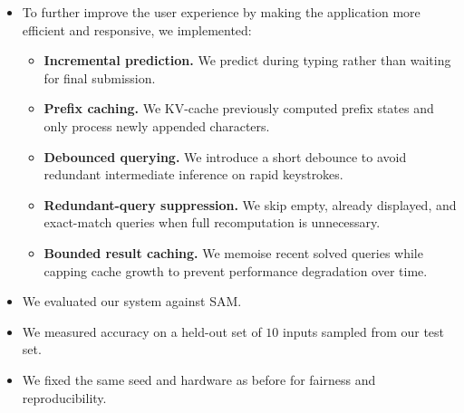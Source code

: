 \documentclass[aspectratio=169,notheorems,10pt]{beamer}
\theoremstyle{definition}
\begin{document}
\begin{frame}

\begin{itemize}
	\item To further improve the user experience by making the application more efficient and responsive, we implemented:
	\begin{itemize}
		\item \textbf{Incremental prediction.} We predict during typing rather than waiting for final submission.
		\item \textbf{Prefix caching.} We KV-cache previously computed prefix states and only process newly appended characters.
		\item \textbf{Debounced querying.} We introduce a short debounce to avoid redundant intermediate inference on rapid keystrokes.
		\item \textbf{Redundant-query suppression.} We skip empty, already displayed, and exact-match queries when full recomputation is unnecessary.
		\item \textbf{Bounded result caching.} We memoise recent solved queries while capping cache growth to prevent performance degradation over time.
	\end{itemize}
\end{itemize}
\end{frame}

\begin{frame}
\begin{itemize}
	\item We evaluated our system against SAM.
	\item We measured accuracy on a held-out set of $10$ inputs sampled from our test set.
	\item We fixed the same seed and hardware as before for fairness and reproducibility.
\end{itemize}
\end{frame}
\end{document}

